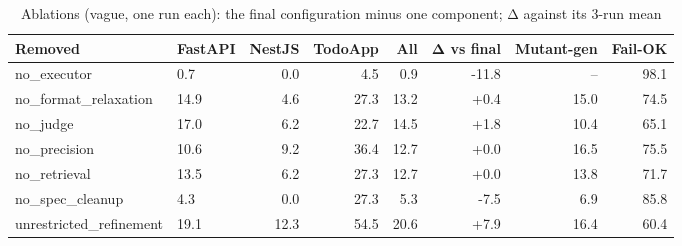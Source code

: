 \begin{table}[t]\centering\small
\caption{Ablations (vague, one run each): the final configuration minus one component; Δ against its 3-run mean}
\begin{tabular}{llrrrrrr}
\toprule
Removed & FastAPI & NestJS & TodoApp & All & Δ vs final & Mutant-gen & Fail-OK \\
\midrule
no\_executor & 0.7 & 0.0 & 4.5 & 0.9 & -11.8 & – & 98.1 \\
no\_format\_relaxation & 14.9 & 4.6 & 27.3 & 13.2 & +0.4 & 15.0 & 74.5 \\
no\_judge & 17.0 & 6.2 & 22.7 & 14.5 & +1.8 & 10.4 & 65.1 \\
no\_precision & 10.6 & 9.2 & 36.4 & 12.7 & +0.0 & 16.5 & 75.5 \\
no\_retrieval & 13.5 & 6.2 & 27.3 & 12.7 & +0.0 & 13.8 & 71.7 \\
no\_spec\_cleanup & 4.3 & 0.0 & 27.3 & 5.3 & -7.5 & 6.9 & 85.8 \\
unrestricted\_refinement & 19.1 & 12.3 & 54.5 & 20.6 & +7.9 & 16.4 & 60.4 \\
\bottomrule
\end{tabular}
\label{tab:ablations}
\end{table}
